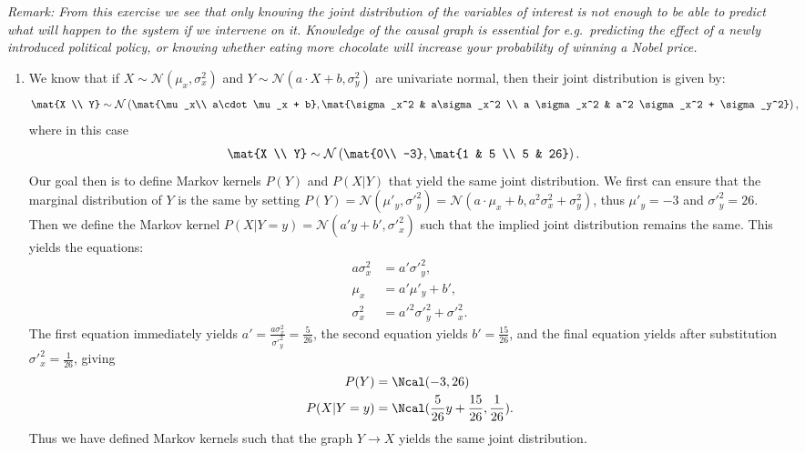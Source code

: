 \begin{enumerate}[label=6.\arabic*]
    \emph{Remark: From this exercise we see that only knowing the joint distribution of the variables of interest is not enough to be able to predict what will happen to the system if we intervene on it. Knowledge of the causal graph is essential for e.g.\ predicting the effect of a newly introduced political policy, or knowing whether eating more chocolate will increase your probability of winning a Nobel price.}

    \begin{gradedsolution}
        \begin{enumerate}
            \item
            We know that if $X\sim\mathcal{N}(\mu_x,\sigma^2_x)$ and $Y\sim\mathcal{N}(a\cdot X+b, \sigma^2_y)$ are univariate normal, then their joint distribution is given by:
            \begin{align*}
                \mat{X \\ Y} &\sim \mathcal{N}\left( \mat{\mu_x\\ a\cdot\mu_x + b}, \mat{\sigma_x^2 & a\sigma_x^2 \\ a \sigma_x^2 & a^2 \sigma_x^2 + \sigma_y^2}\right),
            \end{align*}
            where in this case
            \begin{align*}
                \mat{X \\ Y} &\sim \mathcal{N}\left( \mat{0\\ -3}, \mat{1 & 5 \\ 5 & 26}\right).
            \end{align*}
            Our goal then is to define Markov kernels $P(Y)$ and $P(X|Y)$ that yield the same joint distribution. We first can ensure that the marginal distribution of $Y$ is the same by setting $P(Y) = \mathcal{N}(\mu'_y, \sigma'^2_y) = \mathcal{N}(a\cdot\mu_x + b, a^2 \sigma_x^2 + \sigma_y^2)$, thus $\mu'_y=-3$ and $\sigma'^2_y=26$. Then we define the Markov kernel $P(X|Y=y) = \mathcal{N}(a'y + b', \sigma'^2_x)$ such that the implied joint distribution remains the same. This yields the equations:
            \begin{align*}
                a\sigma_x^2 & = a' \sigma'^2_y,                 \\
                \mu_x       & = a' \mu'_y + b',                 \\
                \sigma^2_x  & = a'^2 \sigma'^2_y + \sigma'^2_x.
            \end{align*}
            The first equation immediately yields $a' = \frac{a\sigma_x^2}{\sigma'^2_y} = \frac{5}{26}$, the second equation yields $b' = \frac{15}{26}$, and the final equation yields after substitution $\sigma'^2_x = \frac{1}{26}$, giving
            \begin{align*}
                P(Y)     & = \Ncal(-3, 26)                                       \\
                P(X|Y=y) & = \Ncal(\frac{5}{26}y + \frac{15}{26}, \frac{1}{26}).
            \end{align*}
            Thus we have defined Markov kernels such that the graph $Y \rightarrow X$ yields the same joint distribution.


\end{enumerate}
\end{gradedsolution}
\end{enumerate}
